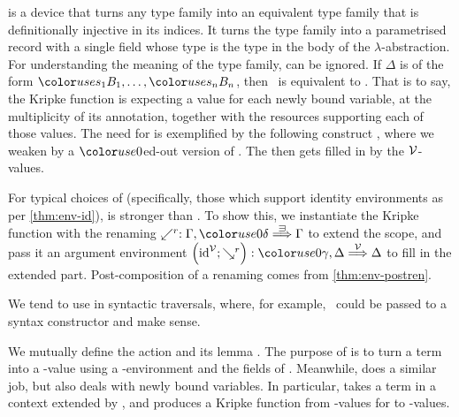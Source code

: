  is a device that turns any type family into an equivalent
type family that is definitionally injective in its indices.
It turns the type family into a parametrised record with a single field
 whose type is the type in the body of the $\lambda$-abstraction.
For understanding the meaning of the type family,  can be
ignored.
If $\Delta$ is of the form $\gr{s_1}B_1, \ldots, \gr{s_n}B_n$, then
\ is equivalent to
.
That is to say, the Kripke function is expecting a value for each newly bound
variable, at the multiplicity of its annotation, together with the resources
supporting each of those values.
The need for  is exemplified by the following construct
, where we weaken \AgdaBound{$\Gamma$} by a $\gr0$ed-out
version of \AgdaBound{$\Delta$}.
The \AgdaBound{$\Delta$} then gets filled in by the $\V$-values.

For typical choices of \AgdaBound{$\V$} (specifically, those which support
identity environments as per \cref{thm:env-id}),
\AgdaSpace{}\AgdaBound{$\V$}\AgdaSpace{}\AgdaBound{$\C$}
is stronger than \AgdaSpace{}\AgdaBound{$\C$}.
To show this, we instantiate the Kripke function with the renaming
$\swarrow^r : \Gamma, \gr0\delta \env\sqni \Gamma$ to extend the scope, and
pass it an argument environment
$\plr{\id^\V; \searrow^r} : \gr0\gamma, \Delta \env\V \Delta$ to fill in the
extended part.
Post-composition of a renaming comes from \cref{thm:env-postren}.


We tend to use  in syntactic traversals, where, for example,
\ could be passed to a syntax
constructor and make sense.



We mutually define the action  and its lemma
.
The purpose of  is to turn a term into a
\AgdaBound{$\C$}-value using a \AgdaBound{$\V$}-environment and the fields of
.
Meanwhile,  does a similar job, but also deals with
newly bound variables.
In particular,  takes a term in a context extended by
\AgdaBound{$\Theta$}, and produces a Kripke function from
\AgdaBound{$\V$}-values for \AgdaBound{$\Theta$} to \AgdaBound{$\C$}-values.

